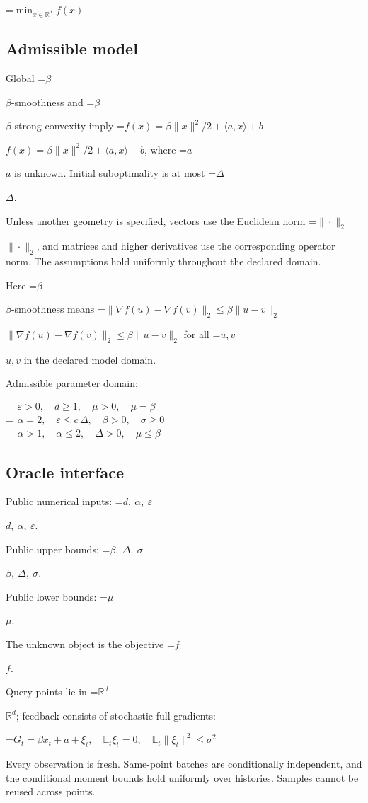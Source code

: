 \documentclass[10pt,a4paper]{article}
\newcommand{\AtlasMath}[1]{\par\begingroup\centering\setbox0=\hbox{$\displaystyle #1$}\ifdim\wd0>1.4\linewidth\typeout{ATLAS WIDE FORMULA: \the\wd0}\fi\ifdim\wd0>\linewidth\resizebox{\linewidth}{!}{\box0}\else\box0\fi\par\endgroup}
\newcommand{\AtlasInlineMath}[1]{\begingroup\setbox0=\hbox{$#1$}\ifdim\wd0>.4\linewidth\endgroup\AtlasMath{#1}\else\endgroup$#1$\fi}
\begin{document}
\AtlasMath{\min_{x\in \mathbb{R}^d}f(x)}


\subsection{Admissible model}
Global \AtlasInlineMath{\beta}-smoothness and \AtlasInlineMath{\beta}-strong convexity imply \AtlasInlineMath{f(x)=\beta\|x\|^2/2+\langle a,x\rangle+b}, where \AtlasInlineMath{a} is unknown. Initial suboptimality is at most \AtlasInlineMath{\Delta}.

Unless another geometry is specified, vectors use the Euclidean norm \AtlasInlineMath{\|\cdot\|_2}, and matrices and higher derivatives use the corresponding operator norm. The assumptions hold uniformly throughout the declared domain.

Here \AtlasInlineMath{\beta}-smoothness means \AtlasInlineMath{\|\nabla f(u)-\nabla f(v)\|_2\le\beta\|u-v\|_2} for all \AtlasInlineMath{u,v} in the declared model domain.

Admissible parameter domain:


\AtlasMath{\begin{gathered}\varepsilon > 0,\quad d \ge 1,\quad \mu > 0,\quad \mu = \beta\\\alpha = 2,\quad \varepsilon \le c\,\Delta,\quad \beta > 0,\quad \sigma \ge 0\\\alpha > 1,\quad \alpha \le 2,\quad \Delta > 0,\quad \mu \le \beta\end{gathered}}


\subsection{Oracle interface}
Public numerical inputs: \AtlasInlineMath{d,\ \alpha,\ \varepsilon}.

Public upper bounds: \AtlasInlineMath{\beta,\ \Delta,\ \sigma}.

Public lower bounds: \AtlasInlineMath{\mu}.

The unknown object is the objective \AtlasInlineMath{f}.

Query points lie in \AtlasInlineMath{\mathbb{R}^d}; feedback consists of stochastic full gradients:


\AtlasMath{G_t=\beta x_t+a+\xi_t,\quad\mathbb{E}_t\xi_t=0,\quad\mathbb{E}_t\|\xi_t\|^2\le\sigma^2}


Every observation is fresh. Same-point batches are conditionally independent, and the conditional moment bounds hold uniformly over histories. Samples cannot be reused across points.
\end{document}
